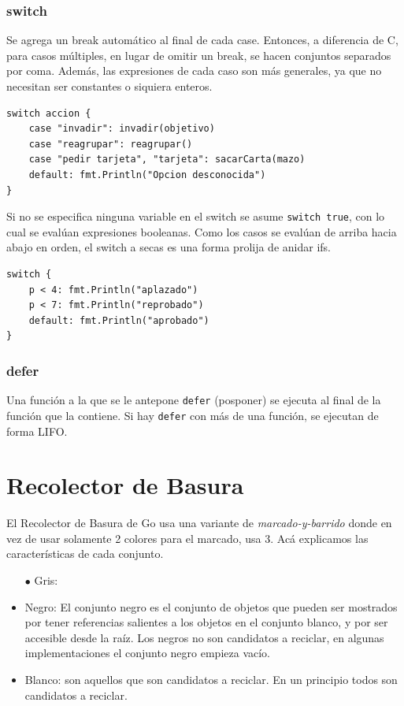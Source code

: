 \documentclass{article}
\begin{document}
\subsubsection{switch}
Se agrega un break automático al final de cada case. Entonces, a diferencia de C, para casos múltiples, en lugar de omitir un break, se hacen conjuntos separados por coma. Además, las expresiones de cada caso son más generales, ya que no necesitan ser constantes o siquiera enteros. 

\begin{lstlisting}[caption = parsear de acciones de T.E.G. (strings)]
switch accion {
	case "invadir": invadir(objetivo)
	case "reagrupar": reagrupar()
	case "pedir tarjeta", "tarjeta": sacarCarta(mazo)
	default: fmt.Println("Opcion desconocida")
}
\end{lstlisting}
Si no se especifica ninguna variable en el switch se asume \lstinline|switch true|, con lo cual se evalúan expresiones booleanas. Como los casos se evalúan de arriba hacia abajo en orden, el switch a secas es una forma prolija de anidar ifs.

\begin{lstlisting}[caption = switch como ifs anidados.]
switch {
	p < 4: fmt.Println("aplazado")
	p < 7: fmt.Println("reprobado")
	default: fmt.Println("aprobado")
}
\end{lstlisting}

\subsubsection{defer}
Una función a la que se le antepone \lstinline|defer| (posponer) se ejecuta al final de la función que la contiene. Si hay \lstinline|defer| con más de una función, se ejecutan de forma LIFO.



\section{Recolector de Basura}
El Recolector de Basura de Go usa una variante de \textit{marcado-y-barrido} donde en vez de usar solamente 2 colores para el marcado, usa 3. 
Acá explicamos las características de cada conjunto.
\begin{itemize}
	\item[$\bullet$] Gris:
	\item Negro: El conjunto negro es el conjunto de objetos que pueden ser mostrados por tener referencias salientes a los objetos en el conjunto blanco, y por ser accesible desde la raíz. Los negros no son candidatos a reciclar, en algunas implementaciones el conjunto negro empieza vacío. 
	\item Blanco: son aquellos que son candidatos a reciclar. En un principio todos son candidatos a reciclar. 
\end{itemize}
\end{document}
